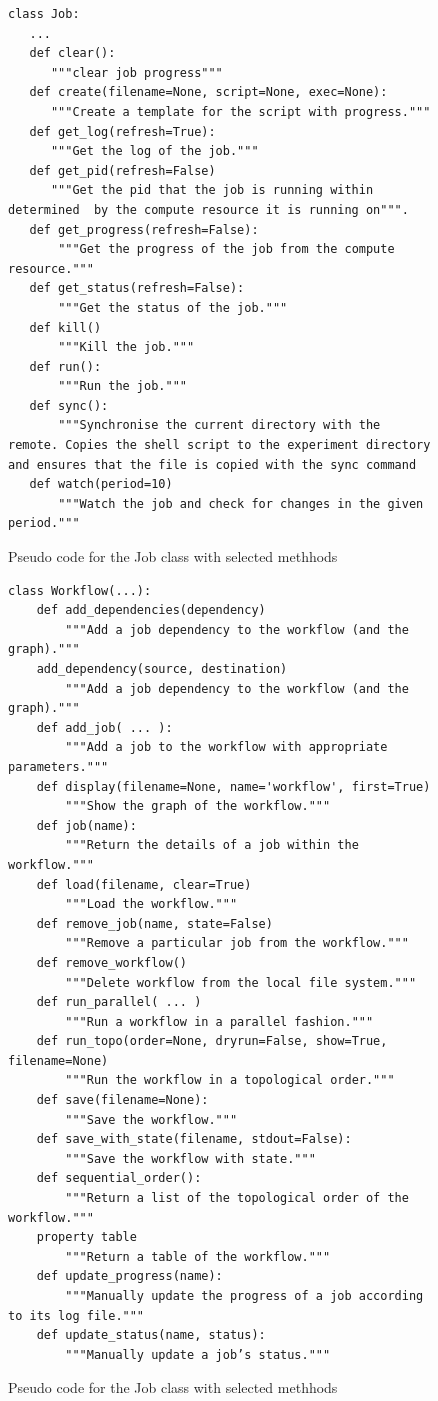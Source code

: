 \begin{figure}[htb]
\caption{Pseudo code for the Job class with selected methhods}
\label{fig:code-job}
\begin{verbatim}
class Job:
   ...
   def clear():
      """clear job progress"""
   def create(filename=None, script=None, exec=None):
      """Create a template for the script with progress."""
   def get_log(refresh=True):
      """Get the log of the job."""
   def get_pid(refresh=False)
      """Get the pid that the job is running within determined  by the compute resource it is running on""".
   def get_progress(refresh=False):
       """Get the progress of the job from the compute resource."""
   def get_status(refresh=False):
       """Get the status of the job."""
   def kill()
       """Kill the job."""
   def run():
       """Run the job."""
   def sync():
       """Synchronise the current directory with the remote. Copies the shell script to the experiment directory and ensures that the file is copied with the sync command
   def watch(period=10)
       """Watch the job and check for changes in the given period."""

\end{verbatim}
\end{figure}

\begin{figure}[htb]
\caption{Pseudo code for the Job class with selected methhods}
\label{fig:code-workflow}
\begin{verbatim}
class Workflow(...):
    def add_dependencies(dependency)
        """Add a job dependency to the workflow (and the graph)."""
    add_dependency(source, destination)
        """Add a job dependency to the workflow (and the graph)."""
    def add_job( ... ):
        """Add a job to the workflow with appropriate parameters."""
    def display(filename=None, name='workflow', first=True)
        """Show the graph of the workflow."""
    def job(name):
        """Return the details of a job within the workflow."""
    def load(filename, clear=True)
        """Load the workflow."""
    def remove_job(name, state=False)
        """Remove a particular job from the workflow."""
    def remove_workflow()
        """Delete workflow from the local file system."""
    def run_parallel( ... )
        """Run a workflow in a parallel fashion."""
    def run_topo(order=None, dryrun=False, show=True, filename=None)
        """Run the workflow in a topological order."""
    def save(filename=None):
        """Save the workflow."""
    def save_with_state(filename, stdout=False):
        """Save the workflow with state."""
    def sequential_order():
        """Return a list of the topological order of the workflow."""
    property table
        """Return a table of the workflow."""
    def update_progress(name):
        """Manually update the progress of a job according to its log file."""
    def update_status(name, status):
        """Manually update a job’s status."""
\end{verbatim}
\end{figure}


